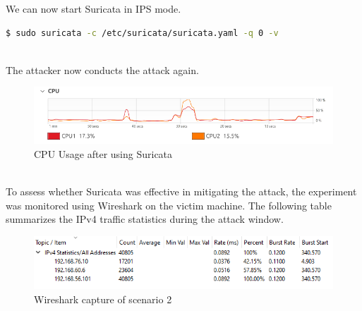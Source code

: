 We can now start Suricata in IPS mode.
\begin{lstlisting}[language=bash,caption={Starting Suricata}]
$ sudo suricata -c /etc/suricata/suricata.yaml -q 0 -v
\end{lstlisting}
\\
The attacker now conducts the attack again.
\begin{figure}[!htb]
    \centering
    \includegraphics[width=0.8\linewidth]{thesis/23.png}
    \caption{CPU Usage after using Suricata}
    \label{fig:enter-label}
\end{figure}
\\ To assess whether Suricata was effective in mitigating the attack, the experiment was monitored using Wireshark on the victim machine. The following table summarizes the IPv4 traffic statistics during the attack window.
\begin{figure}[!htb]
    \centering
    \includegraphics[width=0.8\linewidth]{thesis/scene2.png}
    \caption{Wireshark capture of scenario 2}
    \label{fig:enter-label}
\end{figure}
\begin{table}[!htb]
    \centering
    \caption{Wireshark statistics of scenario 2}
    \label{tab:my_label}
\end{table}
